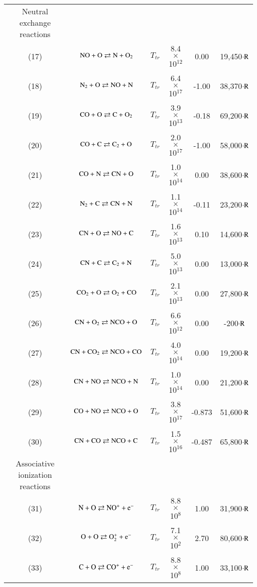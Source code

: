 \documentclass{warpdoc}
\begin{document}
\begin{table}[!h]
\begin{center}
\begin{threeparttable}
\begin{tabular}{cccccc}
Neutral exchange reactions \\

(17) & $\rm NO + O \rightleftarrows N + O_2 $ & $T_{tr}$ & 8.4 $\times$ 10$^{12}$  & 0.00 & 19,450$\cdot \rm R$ \\
(18) & $\rm N_2 + O \rightleftarrows NO + N $ & $T_{tr}$ & 6.4 $\times$ 10$^{17}$  & -1.00 & 38,370$\cdot \rm R$ \\
(19) & $\rm CO + O \rightleftarrows C + O_2 $ & $T_{tr}$ & 3.9 $\times$ 10$^{13}$  & -0.18 & 69,200$\cdot \rm R$ \\
(20) & $\rm CO + C \rightleftarrows C_2 + O $ & $T_{tr}$ & 2.0 $\times$ 10$^{17}$  & -1.00 & 58,000$\cdot \rm R$ \\
(21) & $\rm CO + N \rightleftarrows CN + O $ & $T_{tr}$ & 1.0 $\times$ 10$^{14}$  & 0.00 & 38,600$\cdot \rm R$ \\
(22) & $\rm N_2 + C \rightleftarrows CN + N $ & $T_{tr}$ & 1.1 $\times$ 10$^{14}$  & -0.11 & 23,200$\cdot \rm R$ \\
(23) & $\rm CN + O \rightleftarrows NO + C $ & $T_{tr}$ & 1.6 $\times$ 10$^{13}$  & 0.10 & 14,600$\cdot \rm R$ \\
(24) & $\rm CN + C \rightleftarrows C_2 + N $ & $T_{tr}$ & 5.0 $\times$ 10$^{13}$  & 0.00 & 13,000$\cdot \rm R$ \\
(25) & $\rm CO_2 + O \rightleftarrows O_2 + CO $ & $T_{tr}$ & 2.1 $\times$ 10$^{13}$  & 0.00 & 27,800$\cdot \rm R$ \\
(26) & $\rm CN + O_2 \rightleftarrows NCO + O $ & $T_{tr}$ & 6.6 $\times$ 10$^{12}$  & 0.00 & -200$\cdot \rm R$ \\
(27) & $\rm CN + CO_2 \rightleftarrows NCO + CO $ & $T_{tr}$ & 4.0 $\times$ 10$^{14}$  & 0.00 & 19,200$\cdot \rm R$ \\
(28) & $\rm CN + NO \rightleftarrows NCO + N $ & $T_{tr}$ & 1.0 $\times$ 10$^{14}$  & 0.00 & 21,200$\cdot \rm R$ \\
(29) & $\rm CO + NO \rightleftarrows NCO + O $ & $T_{tr}$ & 3.8 $\times$ 10$^{17}$  & -0.873 & 51,600$\cdot \rm R$ \\
(30) & $\rm CN + CO \rightleftarrows NCO + C $ & $T_{tr}$ & 1.5 $\times$ 10$^{16}$  & -0.487 & 65,800$\cdot \rm R$ \\

Associative ionization reactions \\

(31) & $\rm N + O \rightleftarrows NO^+ + e^- $ & $T_{tr}$ & 8.8 $\times$ 10$^{8}$  & 1.00 & 31,900$\cdot \rm R$ \\
(32) & $\rm O + O \rightleftarrows O^+_2 + e^- $ & $T_{tr}$ & 7.1 $\times$ 10$^{2}$  & 2.70 & 80,600$\cdot \rm R$ \\
(33) & $\rm C + O \rightleftarrows CO^+ + e^- $ & $T_{tr}$ & 8.8 $\times$ 10$^{8}$  & 1.00 & 33,100$\cdot \rm R$\\


\end{tabular}
\end{threeparttable}
\end{center}
\end{table}
\end{document}
